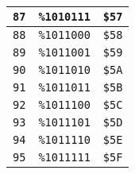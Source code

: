 \begin{multicols}{2}
\begin{center}
\begin{tabular}{|c|c|c|}
 \texttt{87} & \texttt{\%1010111} &  \texttt{\$57} \\ \hline
 \texttt{88} & \texttt{\%1011000} &  \texttt{\$58} \\ \hline
 \texttt{89} & \texttt{\%1011001} &  \texttt{\$59} \\ \hline
 \texttt{90} & \texttt{\%1011010} &  \texttt{\$5A} \\ \hline
 \texttt{91} & \texttt{\%1011011} &  \texttt{\$5B} \\ \hline
 \texttt{92} & \texttt{\%1011100} &  \texttt{\$5C} \\ \hline
 \texttt{93} & \texttt{\%1011101} &  \texttt{\$5D} \\ \hline
 \texttt{94} & \texttt{\%1011110} &  \texttt{\$5E} \\ \hline
 \texttt{95} & \texttt{\%1011111} &  \texttt{\$5F} \\ \hline
 \end{tabular}
\end{center}


\end{multicols}
